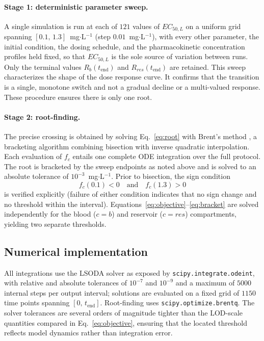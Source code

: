 \documentclass[11pt]{article}
\begin{document}
\paragraph{Stage 1: deterministic parameter sweep.}
A single simulation is run at each of $121$ values of $EC_{50,L}$ on a
uniform grid spanning $[0.1,\,1.3]$~mg$\cdot$L$^{-1}$ (step
$0.01$~mg$\cdot$L$^{-1}$), with every other parameter, the initial
condition, the dosing schedule, and the pharmacokinetic concentration
profiles held fixed, so that $EC_{50,L}$ is the sole source of variation
between runs. Only the terminal values $R_b(t_{\mathrm{end}})$ and
$R_{res}(t_{\mathrm{end}})$ are retained. This sweep characterizes the
shape of the dose response curve.  It confirms that
the transition is a single, monotone switch and not a gradual
decline or a multi-valued response.  These procedure ensures there is only one root.


\paragraph{Stage 2: root-finding.}
The precise crossing is obtained by solving Eq.~\eqref{eq:root} with
Brent's method \cite{brent1973}, a bracketing algorithm combining
bisection with inverse quadratic interpolation. Each evaluation of $f_c$
entails one complete ODE integration over the full protocol. The root is
bracketed by the sweep endpoints as noted above and is solved to an absolute tolerance of
$10^{-3}$~mg$\cdot$L$^{-1}$. Prior to bisection, the sign condition
\begin{equation}
  f_c(0.1) < 0 \quad\text{and}\quad f_c(1.3) > 0
  \label{eq:bracket}
\end{equation}
is verified explicitly (failure of either condition indicates that no sign
change and no threshold within the interval).
Equations~\eqref{eq:objective}--\eqref{eq:bracket} are solved independently
for the blood ($c = b$) and reservoir ($c = res$) compartments, yielding
two separate thresholds.

\subsection{Numerical implementation}

All integrations use the LSODA solver as exposed by
\texttt{scipy.integrate.odeint}, with relative and absolute tolerances of
$10^{-7}$ and $10^{-9}$ and a maximum of $5000$ internal steps per output
interval; solutions are evaluated on a fixed grid of $1150$ time points
spanning $[0,\,t_{\mathrm{end}}]$. Root-finding uses
\texttt{scipy.optimize.brentq}. The solver tolerances are several orders of
magnitude tighter than the LOD-scale quantities compared in
Eq.~\eqref{eq:objective}, ensuring that the located threshold reflects
model dynamics rather than integration error.
\end{document}
